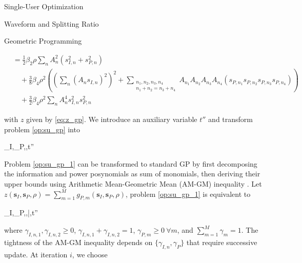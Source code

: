 \documentclass{IEEEtran}
\begin{document}
\begin{section}{Single-User Optimization}
\begin{subsection}{Waveform and Splitting Ratio}
\begin{subsubsection}{Geometric Programming}
\begin{figure*}[b]
\begin{equation}
\begin{split}
						&=\frac{1}{2}{\beta_2}{\rho}\sum_n{A_n^2(s_{I,n}^2+s_{P,n}^2)}\\
						&\quad+\frac{3}{8}{\beta_4}{\rho^2} \left(\left(\sum_{n}(A_n s_{I,n})^2\right)^2 + \sum_{\substack{{n_1},{n_2},{n_3},{n_4}\\{n_1}+{n_2}={n_3}+{n_4}}}{A_{n_1}A_{n_2}A_{n_3}A_{n_4}(s_{P,n_1}s_{P,n_2}s_{P,n_3}s_{P,n_4})}\right)\\
						&\quad+\frac{3}{2}{\beta_4}{\rho^2}\sum_n{{A_n^4}{s_{I,n}^2}{s_{P,n}^2}}
					\end{split}
				\end{equation}
			\end{figure*}
			with $z$ given by \ref{eq:z_gp}. We introduce an auxiliary variable $t''$ and transform problem \ref{op:su_gp} into
			\begin{mini!}
					{\boldsymbol{s}_I,_P,\rho,t''}{}{\label{op:su_gp_1}}{}
				\end{mini!}
			Problem \ref{op:su_gp_1} can be transformed to standard GP by first decomposing the information and power posynomials as sum of monomials, then deriving their upper bounds using Arithmetic Mean-Geometric Mean (AM-GM) inequality \cite{Clerckx2018b,Chiang2005}. Let $z(\boldsymbol{s}_I,\boldsymbol{s}_P,\rho)=\sum_{m=1}^{M}{g_{P,m}(\boldsymbol{s}_I,\boldsymbol{s}_P,\rho)}$, problem \ref{op:su_gp_1} is equivalent to
			\begin{mini}
				{\boldsymbol{s}_I,_P,\rho,\bar{\rho},t''}{}{\label{op:su_gp_2}}{}
			\end{mini}
			where $\gamma_{I,n,1},\gamma_{I,n,2} \ge 0$, $\gamma_{I,n,1}+\gamma_{I,n,2}=1$, $\gamma_{P,m} \ge 0 \ \forall m$, and $\sum_{m=1}^{M}{\gamma_m}=1$. The tightness of the AM-GM inequality depends on $\{\gamma_{I,n},\gamma_P\}$ that require successive update. At iteration $i$, we choose \cite{Clerckx2018b}

\end{subsubsection}
\end{subsection}
\end{section}
\end{document}

